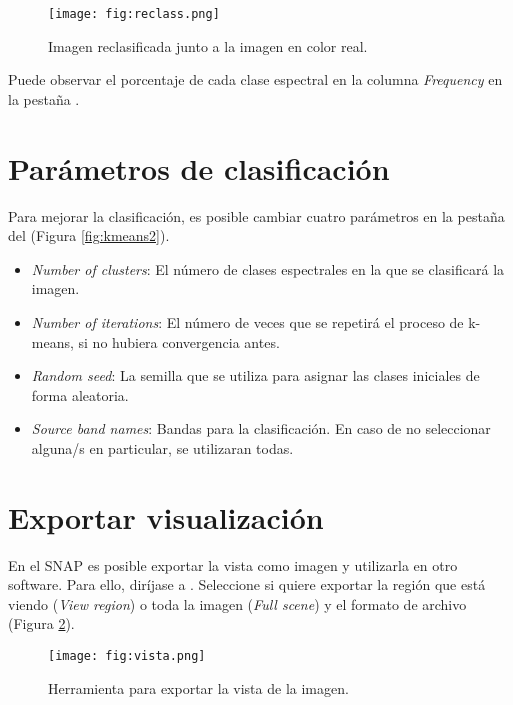 \begin{figure}[h!]
    \centering
    \texttt{[image: fig:reclass.png]}
    \caption{Imagen reclasificada junto a la imagen en color real.}
    \label{fig:resclass}
\end{figure}


Puede observar el porcentaje de cada clase espectral en la columna \emph{Frequency} en la pestaña .

\section{Parámetros de clasificación}

Para mejorar la clasificación, es posible cambiar cuatro parámetros en la pestaña  del  (Figura \ref{fig:kmeans2}).

\begin{itemize}
  \item \emph{Number of clusters}: El número de clases espectrales en la que se clasificará la imagen.
  \item \emph{Number of iterations}: El número de veces que se repetirá el proceso de k-means, si no hubiera convergencia antes.
  \item \emph{Random seed}: La semilla que se utiliza para asignar las clases iniciales de forma aleatoria.
  \item \emph{Source band names}: Bandas para la clasificación. En caso de no seleccionar alguna/s en particular, se utilizaran todas.
\end{itemize}

\section{Exportar visualización}

En el SNAP es posible exportar la vista como imagen y utilizarla en otro software. Para ello, diríjase a . Seleccione si quiere exportar la región que está viendo (\emph{View region}) o toda la imagen (\emph{Full scene}) y el formato de archivo (Figura \ref{fig:vista}).

\begin{figure}[h!]
    \centering
    \texttt{[image: fig:vista.png]}
    \caption{Herramienta para exportar la vista de la imagen.}
    \label{fig:vista}
\end{figure}

